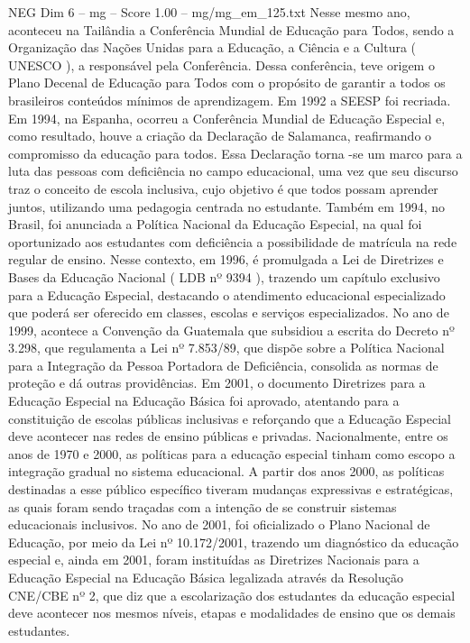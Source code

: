 \begin{textsample}{NEG Dim 6 – mg – Score 1.00 – mg/mg\_em\_125.txt}
Nesse mesmo ano, aconteceu na Tailândia a Conferência Mundial de Educação para Todos, sendo a Organização das Nações Unidas para a Educação, a Ciência e a Cultura ( UNESCO ), a responsável pela Conferência.
Dessa conferência, teve origem o Plano Decenal de Educação para Todos com o propósito de garantir a todos os brasileiros conteúdos mínimos de aprendizagem.
Em 1992 a SEESP foi recriada.
Em 1994, na Espanha, ocorreu a Conferência Mundial de Educação Especial e, como resultado, houve a criação da Declaração de Salamanca, reafirmando o compromisso da educação para todos.
Essa Declaração torna -se um marco para a luta das pessoas com deficiência no campo educacional, uma vez que seu discurso traz o conceito de escola inclusiva, cujo objetivo é que todos possam aprender juntos, utilizando uma pedagogia centrada no estudante.
Também em 1994, no Brasil, foi anunciada a Política Nacional da Educação Especial, na qual foi oportunizado aos estudantes com deficiência a possibilidade de matrícula na rede regular de ensino.
Nesse contexto, em 1996, é promulgada a Lei de Diretrizes e Bases da Educação Nacional ( LDB nº 9394 ), trazendo um capítulo exclusivo para a Educação Especial, destacando o atendimento educacional especializado que poderá ser oferecido em classes, escolas e serviços especializados.
No ano de 1999, acontece a Convenção da Guatemala que subsidiou a escrita do Decreto nº 3.298, que regulamenta a Lei nº 7.853/89, que dispõe sobre a Política Nacional para a Integração da Pessoa Portadora de Deficiência, consolida as normas de proteção e dá outras providências.
Em 2001, o documento Diretrizes para a Educação Especial na Educação Básica foi aprovado, atentando para a constituição de escolas públicas inclusivas e reforçando que a Educação Especial deve acontecer nas redes de ensino públicas e privadas.
Nacionalmente, entre os anos de 1970 e 2000, as políticas para a educação especial tinham como escopo a integração gradual no sistema educacional.
A partir dos anos 2000, as políticas destinadas a esse público específico tiveram mudanças expressivas e estratégicas, as quais foram sendo traçadas com a intenção de se construir sistemas educacionais inclusivos.
No ano de 2001, foi oficializado o Plano Nacional de Educação, por meio da Lei nº 10.172/2001, trazendo um diagnóstico da educação especial e, ainda em 2001, foram instituídas as Diretrizes Nacionais para a Educação Especial na Educação Básica legalizada através da Resolução CNE/CBE nº 2, que diz que a escolarização dos estudantes da educação especial deve acontecer nos mesmos níveis, etapas e modalidades de ensino que os demais estudantes.

\end{textsample}
